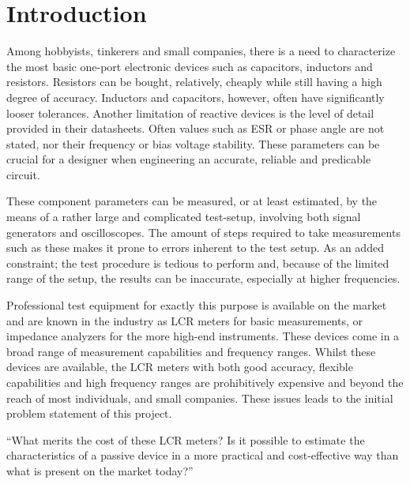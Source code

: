 \chapter{Introduction} \label{ch:Introduction}
Among hobbyists, tinkerers and small companies, there is a need to characterize the most basic one-port electronic devices such as capacitors, inductors and resistors. Resistors can be bought, relatively, cheaply while still having a high degree of accuracy. Inductors and capacitors, however, often have significantly looser tolerances. Another limitation of reactive devices is the level of detail provided in their datasheets. Often values such as ESR or phase angle are not stated, nor their frequency or bias voltage stability. These parameters can be crucial for a designer when engineering an accurate, reliable and predicable circuit.

These component parameters can be measured, or at least estimated, by the means of a rather large and complicated test-setup, involving both signal generators and oscilloscopes. The amount of steps required to take measurements such as these makes it prone to errors inherent to the test setup. As an added constraint; the test procedure is tedious to perform and, because of the limited range of the setup, the results can be inaccurate, especially at higher frequencies.

Professional test equipment for exactly this purpose is available on the market and are known in the industry as LCR meters for basic measurements, or impedance analyzers for the more high-end instruments. These devices come in a broad range of measurement capabilities and frequency ranges. Whilst these devices are available, the LCR meters with both good accuracy, flexible capabilities and high frequency ranges are prohibitively expensive and beyond the reach of most individuals, and small companies. These issues leads to the initial problem statement of this project.

“What merits the cost of these LCR meters? Is it possible to estimate the characteristics of a passive device in a more practical and cost-effective way than what is present on the market today?”
